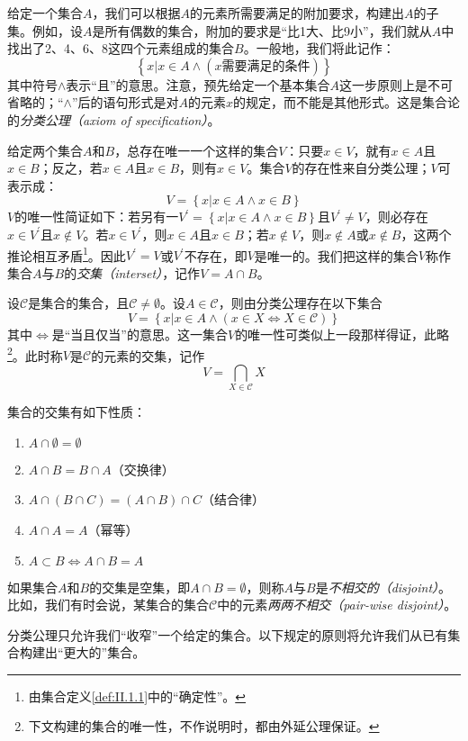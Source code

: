 \documentclass[../main.tex]{subfiles}
\begin{document}
给定一个集合$A$，我们可以根据$A$的元素所需要满足的附加要求，构建出$A$的子集。例如，设$A$是所有偶数的集合，附加的要求是“比1大、比9小”，我们就从$A$中找出了2、4、6、8这四个元素组成的集合$B$。一般地，我们将此记作：
\[
\left\{x|x\in A\wedge\left(\text{$x$需要满足的条件}\right)\right\}
\]
其中符号$\wedge$表示“且”的意思。注意，预先给定一个基本集合$A$这一步原则上是不可省略的；“$\wedge$”后的语句形式是对$A$的元素$x$的规定，而不能是其他形式。这是集合论的\emph{分类公理（axiom of specification）}。

给定两个集合$A$和$B$，总存在唯一一个这样的集合$V$：只要$x\in V$，就有$x\in A$且$x\in B$；反之，若$x\in A$且$x\in B$，则有$x\in V$。集合$V$的存在性来自分类公理；$V$可表示成：
\[
V=\left\{x|x\in A\wedge x\in B\right\}
\]
$V$的唯一性简证如下：若另有一$V^\prime=\left\{x|x\in A\wedge x\in B\right\}$且$V^\prime\neq V$，则必存在$x\in V^\prime$且$x\notin V$。若$x\in V^\prime$，则$x\in A$且$x\in B$；若$x\notin V$，则$x\notin A$或$x\notin B$，这两个推论相互矛盾\footnote{由集合定义\ref{def:II.1.1}中的“确定性”。}。因此$V^\prime=V$或$V^\prime$不存在，即$V$是唯一的。我们把这样的集合$V$称作集合$A$与$B$的\emph{交集（interset）}，记作$V=A\cap B$。

设$\mathcal{C}$是集合的集合，且$\mathcal{C}\neq\emptyset$。设$A\in\mathcal{C}$，则由分类公理存在以下集合
\[
    V=\left\{x|x\in A\wedge \left(x\in X\Leftrightarrow X\in\mathcal{C}\right)\right\}
\]
其中$\Leftrightarrow$是“当且仅当”的意思。这一集合$V$的唯一性可类似上一段那样得证，此略\footnote{下文构建的集合的唯一性，不作说明时，都由外延公理保证。}。此时称$V$是$\mathcal{C}$的元素的交集，记作
\[
V=\bigcap_{X\in\mathcal{C}}X
\]

集合的交集有如下性质：
\begin{enumerate}
\item $A\cap\emptyset=\emptyset$
\item $A\cap B=B\cap A$（交换律）
\item $A\cap\left(B\cap C\right)=\left(A\cap B\right)\cap C$（结合律）
\item $A\cap A=A$（幂等）
\item $A\subset B\Leftrightarrow A\cap B=A$
\end{enumerate}

如果集合$A$和$B$的交集是空集，即$A\cap B=\emptyset$，则称$A$与$B$是\emph{不相交的（disjoint）}。比如，我们有时会说，某集合的集合$\mathcal{C}$中的元素\emph{两两不相交（pair-wise disjoint）}。

分类公理只允许我们“收窄”一个给定的集合。以下规定的原则将允许我们从已有集合构建出“更大的”集合。
\end{document}
